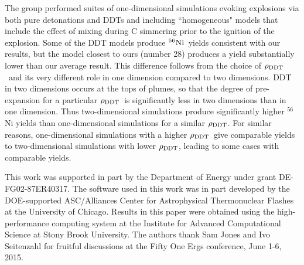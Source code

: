 \documentclass[iop,apj]{emulateapj}
\newcommand{\Ni}[1]{\ensuremath{{}^{#1}{\rm Ni}}}
\newcommand{\rhoDDT}{\ensuremath{\rho_{\rm DDT}}}
\begin{document}
The group performed suites of one-dimensional simulations evoking
explosions via both pure detonations and DDTs and including
``homogeneous" models that include the effect of mixing during C
simmering prior to the ignition of the explosion. Some of the DDT
models produce \Ni{56}~yields consistent with our results, but the
model closest to ours (number 28) produces a yield substantially lower
than our average result. This difference follows from the choice of
\rhoDDT~and its very different role in one dimension compared to two
dimensions. DDT in two dimensions occurs at the tops of plumes, so
that the degree of pre-expansion for a particular \rhoDDT~is
significantly less in two dimensions than in one dimension.  Thus
two-dimensional simulations produce significantly higher $^{56}$Ni
yields than one-dimensional simulations for a similar \rhoDDT.  For
similar reasons, one-dimensional simulations with a higher
\rhoDDT~give comparable yields to two-dimensional simulations with
lower \rhoDDT, leading to some cases with comparable yields.


\acknowledgements

This work was supported in part by the Department of Energy under
grant DE-FG02-87ER40317. The software used in this work was in part
developed by the DOE-supported ASC/Alliances Center for Astrophysical
Thermonuclear Flashes at the University of Chicago. Results in this
paper were obtained using the high-performance computing system at the
Institute for Advanced Computational Science at Stony Brook
University. The authors thank Sam Jones and Ivo Seitenzahl for
fruitful discussions at the Fifty One Ergs conference, June 1-6, 2015.



\end{document}
